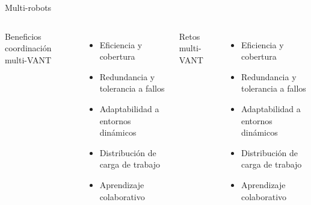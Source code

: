 \documentclass[
	12pt, %
	aspectratio=169, %
]{beamer}
\begin{document}
\begin{frame}{Multi-robots}
  \begin{columns}
    Beneficios coordinación multi-VANT
    \begin{itemize}
    \item Eficiencia y cobertura
    \item Redundancia y tolerancia a fallos
    \item Adaptabilidad a entornos dinámicos
    \item Distribución de carga de trabajo
    \item Aprendizaje colaborativo
    \end{itemize}
    Retos multi-VANT
    \begin{itemize}
    \item Eficiencia y cobertura
    \item Redundancia y tolerancia a fallos
    \item Adaptabilidad a entornos dinámicos
    \item Distribución de carga de trabajo
    \item Aprendizaje colaborativo
    \end{itemize}
  \end{columns}
\end{frame}


\end{document}
